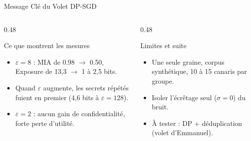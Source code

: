 \begin{frame}{Message Clé du Volet DP-SGD}
    \begin{columns}[T]
        \begin{column}{0.48\textwidth}
            \begin{block}{Ce que montrent les mesures}
                \small
                \begin{itemize}
                    \item $\varepsilon = 8$ : MIA de 0.98 $\to$ 0.50, Exposure de 13,3 $\to$ 1 à 2,5 bits.
                    \item Quand $\varepsilon$ augmente, les secrets répétés fuient en premier (4,6 bits à $\varepsilon = 128$).
                    \item $\varepsilon = 2$ : aucun gain de confidentialité, forte perte d'utilité.
                \end{itemize}
            \end{block}
        \end{column}
        \begin{column}{0.48\textwidth}
            \begin{alertblock}{Limites et suite}
                \small
                \begin{itemize}
                    \item Une seule graine, corpus synthétique, 10 à 15 canaris par groupe.
                    \item Isoler l'écrêtage seul ($\sigma = 0$) du bruit.
                    \item À tester : DP + déduplication (volet d'Emmanuel).
                \end{itemize}
            \end{alertblock}
        \end{column}
    \end{columns}
\end{frame}
